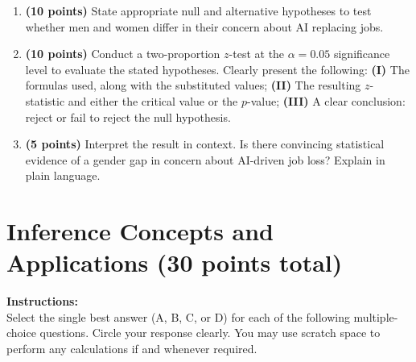 \documentclass{article}
\newcommand{\blankbox}[2][3cm]{%
    \vspace{-0.5em}
    \begin{figure}[H]
        \makebox[\linewidth]{%
            \begin{tcolorbox}[
                colback=white,
                colframe=white,  %
                width=#2, %
                height=#1,
                boxrule=0.2mm
            ]
            \end{tcolorbox}
        }
    \end{figure}
    \vspace{-2em}
}
\begin{document}
\begin{enumerate}
    \item \textbf{(10 points)} State appropriate null and alternative hypotheses to test whether men and women differ in their concern about AI replacing jobs.  \blankbox[3cm]{1.0\linewidth}
    \item \textbf{(10 points)} Conduct a two-proportion $z$-test at the $\alpha = 0.05$ significance level to evaluate the stated hypotheses. Clearly present the following: \textbf{(I)} The formulas used, along with the substituted values;
    \textbf{(II)} The resulting $z$-statistic and either the critical value or the $p$-value;
    \textbf{(III)} A clear conclusion: reject or fail to reject the null hypothesis.
    \blankbox[9cm]{1.0\linewidth}

    \item  \textbf{(5 points)}  Interpret the result in context. Is there convincing statistical evidence of a gender gap in concern about AI-driven job loss? Explain in plain language.  \blankbox[6cm]{1.0\linewidth}
\end{enumerate}

\newpage
\section{Inference Concepts and Applications (30 points total)}
\noindent\textbf{Instructions:} \\
Select the single best answer (A, B, C, or D) for each of the following multiple-choice questions. Circle your response clearly. You may use scratch space to perform any calculations if and whenever required.
\end{document}
